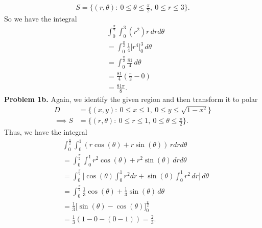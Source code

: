 \documentclass{report}
\begin{document}
    \begin{align*}
        S = \{(r,\theta ):\ 0 \leq \theta  \leq \frac{\pi}{2},\ 0 \leq r \leq 3\}
    .\end{align*}
    \bigbreak \noindent 
    So we have the integral
    \begin{align*}
        &\int_{0}^{\frac{\pi}{2} }\int_{0}^{3} (r^{2})r \, drd\theta  \\
        &=\int_{0}^{\frac{\pi}{2}}  \frac{1}{4}\bigg[r^{4}\bigg]_{0}^{3}\, d\theta  \\
        &=\int_{0}^{\frac{\pi}{2}}  \frac{81}{4}\, d\theta  \\
        &=\frac{81}{4}(\frac{\pi}{2}-0) \\
        &=\frac{81\pi}{8}
    .\end{align*}
    \bigbreak \noindent 
    \textbf{Problem 1b.} Again, we identify the given region and then transform it to polar
    \begin{align*}
        D &= \{(x,y):\ 0 \leq x \leq 1,\ 0 \leq y \leq \sqrt{1-x^{2}}\} \\
        \implies  S &= \{(r,\theta ):\ 0 \leq r \leq 1,\ 0 \leq \theta  \leq \frac{\pi}{2}\}
    .\end{align*}
    \bigbreak \noindent 
    Thus, we have the integral
    \begin{align*}
        &\int_{0}^{\frac{\pi}{2}}\int_{0}^{1} (r\cos{\left(\theta \right)}+r\sin{\left(\theta \right)})\, rdrd\theta  \\
        &=\int_{0}^{\frac{\pi}{2}}\int_{0}^{1}r^{2}\cos{\left(\theta \right)} +r^{2}\sin{\left(\theta \right)} \,drd\theta  \\
        &=\int_{0}^{\frac{\pi}{2}}\bigg[\cos{\left(\theta \right)}\int_{0}^{1}r^{2}dr+\sin{\left(\theta \right)}\int_{0}^{1} r^{2} \, dr\bigg]  \, d\theta  \\
        &=\int_{0}^{\frac{\pi}{2}}  \frac{1}{3}\cos{\left(\theta \right)} + \frac{1}{3}\sin{\left(\theta \right)}\, d\theta  \\
        &=\frac{1}{3}\bigg[\sin{\left(\theta \right)}-\cos{\left(\theta \right)}\bigg]_{0}^{\frac{\pi}{2}} \\
        &=\frac{1}{3}(1-0-(0-1)) = \frac{2}{3}
    .\end{align*}
\end{document}
